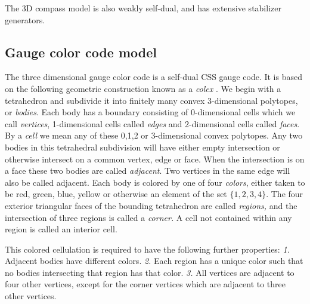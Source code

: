 \documentclass[11pt,oneside]{article}
\begin{document}
The 3D compass model is also weakly self-dual,
and has extensive stabilizer generators.

\subsection{Gauge color code model}\label{Sec44}

The three dimensional gauge color code \cite{Bombin2015,Bombin2015single,Kubica2015}
is a self-dual CSS gauge code. 
It is based on the following geometric construction known
as a \emph{colex} \cite{Bombin2007exact}.
We begin with a tetrahedron and subdivide it into finitely many
convex 3-dimensional polytopes, or \emph{bodies}.
Each body has a boundary consisting of 0-dimensional cells
which we call \emph{vertices}, 1-dimensional cells called \emph{edges}
and 2-dimensional cells called \emph{faces}.
By a \emph{cell} we mean any of these 0,1,2 or 3-dimensional convex polytopes.
Any two bodies in this tetrahedral subdivision will
have either empty intersection or otherwise intersect
on a common vertex, edge or face.
When the intersection is on a face these two bodies
are called \emph{adjacent}.
Two vertices in the same edge will also be called adjacent.
Each body is colored by one of four \emph{colors},
either taken to be red, green, blue, yellow or 
otherwise an element of the set $\{1, 2, 3, 4\}.$
The four exterior triangular faces of the bounding tetrahedron are
called \emph{regions,}
and the intersection of three regions is called
a \emph{corner.}
A cell not contained within any region is called an interior cell.

This colored cellulation is required to have the following further properties:
\emph{1.} Adjacent bodies have different colors.
\emph{2.} Each region has a unique color 
such that no bodies intersecting that region has that color.
\emph{3.} All vertices are adjacent to four other vertices,
except for the corner vertices which are adjacent to three other vertices.
\end{document}
